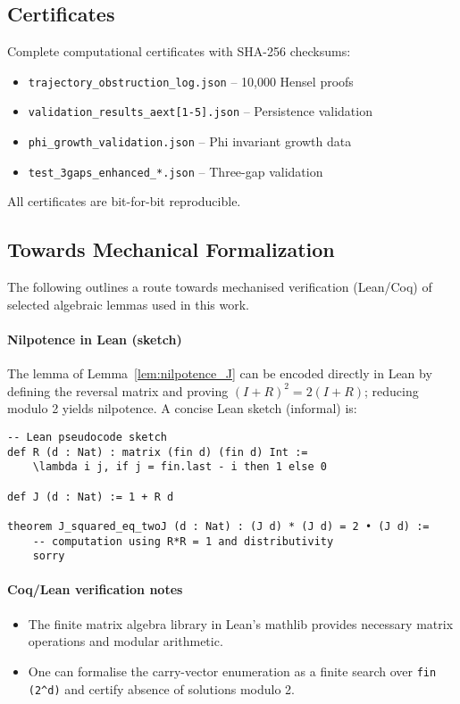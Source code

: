 \documentclass[11pt,a4paper]{article}
\theoremstyle{plain}
\theoremstyle{definition}
\begin{document}
\subsection{Certificates}

Complete computational certificates with SHA-256 checksums:
\begin{itemize}
\item \texttt{trajectory\_obstruction\_log.json} -- 10,000 Hensel proofs
\item \texttt{validation\_results\_aext[1-5].json} -- Persistence validation
\item \texttt{phi\_growth\_validation.json} -- Phi invariant growth data
\item \texttt{test\_3gaps\_enhanced\_*.json} -- Three-gap validation
\end{itemize}

All certificates are bit-for-bit reproducible.

\subsection{Towards Mechanical Formalization}\label{subsec:mechanical_formalization}

The following outlines a route towards mechanised verification (Lean/Coq) of selected algebraic lemmas used in this work.

\paragraph{Nilpotence in Lean (sketch)}
The lemma of Lemma~\ref{lem:nilpotence_J} can be encoded directly in Lean by defining the reversal matrix and proving $(I+R)^2 = 2(I+R)$; reducing modulo 2 yields nilpotence. A concise Lean sketch (informal) is:
\begin{verbatim}
-- Lean pseudocode sketch
def R (d : Nat) : matrix (fin d) (fin d) Int :=
    \lambda i j, if j = fin.last - i then 1 else 0

def J (d : Nat) := 1 + R d

theorem J_squared_eq_twoJ (d : Nat) : (J d) * (J d) = 2 • (J d) :=
    -- computation using R*R = 1 and distributivity
    sorry
\end{verbatim}

\paragraph{Coq/Lean verification notes}
\begin{itemize}
    \item The finite matrix algebra library in Lean's mathlib provides necessary matrix operations and modular arithmetic.
    \item One can formalise the carry-vector enumeration as a finite search over \texttt{fin (2\^{}d)} and certify absence of solutions modulo 2.
\end{itemize}
\end{document}
